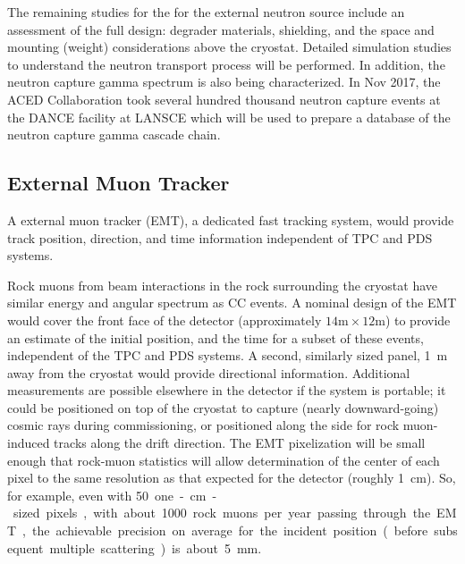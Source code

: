 The remaining studies for the  for the external neutron source include an assessment of the full design: degrader materials, shielding, and the space and mounting (weight) considerations above the cryostat. Detailed simulation studies to understand the neutron transport process will be performed. In addition, the neutron capture gamma spectrum is also being characterized. In Nov 2017, the ACED\cite{aced-svoboda} Collaboration took several hundred thousand neutron capture events at the DANCE\cite{Reifarth:2013xny} facility at LANSCE which will be used to prepare a database of the neutron capture gamma cascade chain. 

\subsection{External Muon Tracker} %
\label{sec:calibemt}

A external muon tracker (EMT), a dedicated fast tracking system, would provide track position, direction, and time information independent of TPC and PDS systems.

Rock muons from beam interactions in the rock surrounding the cryostat have similar energy  and angular  spectrum as CC \numu 
events. A nominal design of the EMT would cover the front face of the detector (approximately $14\textrm{m} \times 12\textrm{m}$) to provide an estimate of the initial position, and the time for a subset of these events, independent of the TPC and PDS systems. A second, similarly sized panel, \SI{1}{\m} away from the cryostat would provide directional information. 
Additional measurements are possible elsewhere in the detector if the system is portable; it could be positioned on top of the cryostat to capture (nearly downward-going) cosmic rays during commissioning, or positioned along the side for rock muon-induced tracks along the drift direction. The EMT  pixelization will be small enough that rock-muon statistics will allow  determination of the center of each pixel to the same resolution as that expected for the detector (roughly \SI{1}{\cm}). So, for example, even with \SI{50} one-\si{\cm}-sized pixels,  with about \num{1000} rock muons per year passing through the EMT, the achievable precision  on average  for the incident position (before subsequent multiple scattering) is about \SI{5}{\milli\m}. 

